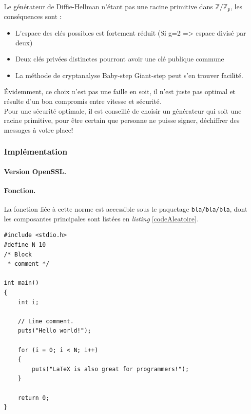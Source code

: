 		Le générateur de Diffie-Hellman n'étant pas une racine primitive dans 
		$\mathbb{Z}/\mathbb{Z}_p$, les conséquences sont :
		\begin{itemize}
		\item L'espace des clés possibles est fortement réduit (Si g=2 => espace 
		divisé par deux)
		\item Deux clés privées distinctes pourront avoir une clé publique commune
		\item La méthode de cryptanalyse Baby-step Giant-step peut s'en trouver 
		facilité.\\
		\end{itemize}
	
		Évidemment, ce choix n'est pas une faille en soit, il n'est juste pas 
		optimal et résulte d'un bon compromis entre vitesse et sécurité.\\
		
		Pour une sécurité optimale, il est conseillé de choisir un générateur qui 
		soit une racine primitive, pour être certain que personne ne puisse 
		signer, déchiffrer des messages à votre place!\\
	
	
		\subsubsection{Implémentation}
		
		\paragraph{Version OpenSSL.\\}
		
		\paragraph{Fonction.\\}
		La fonction liée à cette norme est accessible sous le paquetage \texttt{bla/bla/bla}, dont les composantes principales sont listées en \textit{listing} \ref{codeAleatoire}.
		
		
		\begin{lstlisting}[style=customc,caption=codeAleatoire.c, label=codeAleatoire]
#include <stdio.h>
#define N 10
/* Block
 * comment */
 
int main()
{
    int i;
 
    // Line comment.
    puts("Hello world!");
 
    for (i = 0; i < N; i++)
    {
        puts("LaTeX is also great for programmers!");
    }
 
    return 0;
}
		\end{lstlisting}
		
